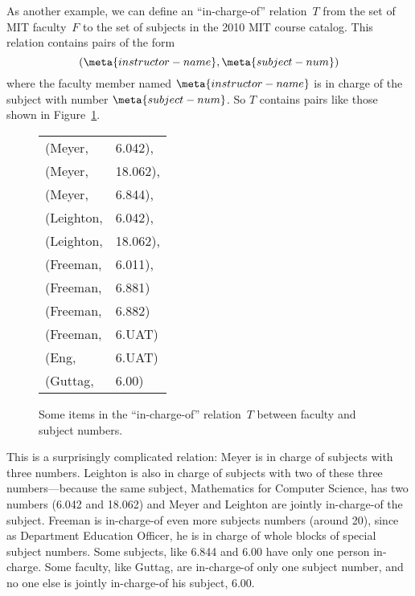 As another example, we can define an ``in-charge-of'' relation~$T$
from the set of MIT faculty~$F$ to the set of subjects in the 2010 MIT
course catalog.  This relation contains pairs of the form
\[
    (\meta{instructor-name}, \meta{subject-num})
\]
where the faculty member named $\meta{instructor-name}$ is in charge
of the subject with number $\meta{subject-num}$.  So $T$ contains
pairs like those shown in Figure~\ref{fig:7FA}.

\begin{figure}

\begin{tabular}{ll}
(Meyer,    & 6.042),\\
(Meyer,    & 18.062),\\
(Meyer,    & 6.844),\\
(Leighton, & 6.042),\\
(Leighton, & 18.062),\\
(Freeman,  & 6.011),\\
(Freeman,  & 6.881)\\
(Freeman,  & 6.882)\\
(Freeman,  & 6.UAT)\\
(Eng,      & 6.UAT)\\
(Guttag,   & 6.00)
\end{tabular}

\caption{Some items in the ``in-charge-of'' relation~$T$ between
  faculty and subject numbers.}

\label{fig:7FA}

\end{figure}

%
This is a surprisingly complicated relation: Meyer is in charge of
subjects with three numbers.  Leighton is also in charge of subjects
with two of these three numbers---because the same subject,
Mathematics for Computer Science, has two numbers (6.042 and 18.062)
and Meyer and Leighton are jointly in-charge-of the subject.  Freeman
is in-charge-of even more subjects numbers (around 20), since as
Department Education Officer, he is in charge of whole blocks of
special subject numbers.  Some subjects, like 6.844 and 6.00 have only
one person in-charge.  Some faculty, like Guttag, are in-charge-of
only one subject number, and no one else is jointly in-charge-of his
subject, 6.00.

